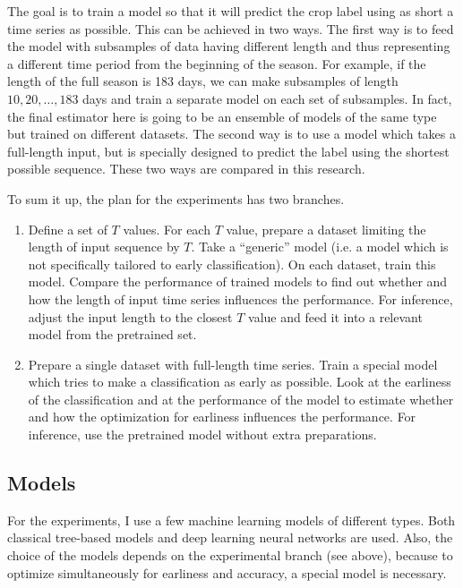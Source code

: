 \documentclass{article}
\begin{document}
The goal is to train a model so that it will predict the crop label using as short a time series as possible. This can be achieved in two ways. The first way is to feed the model with subsamples of data having different length and thus representing a different time period from the beginning of the season. For example, if the length of the full season is 183 days, we can make subsamples of length $10, 20 , \ldots, 183$ days and train a separate model on each set of subsamples. In fact, the final estimator here is going to be an ensemble of models of the same type but trained on different datasets. The second way is to use a model which takes a full-length input, but is specially designed to predict the label using the shortest possible sequence. These two ways are compared in this research.

To sum it up, the plan for the experiments has two branches.

\begin{enumerate}
    \item Define a set of $T$ values. For each $T$ value, prepare a dataset limiting the length of input sequence by $T$. Take a “generic” model (i.e. a model which is not specifically tailored to early classification). On each dataset, train this model. Compare the performance of trained models to find out whether and how the length of input time series influences the performance. For inference, adjust the input length to the closest $T$ value and feed it into a relevant model from the pretrained set.
    \item Prepare a single dataset with full-length time series. Train a special model which tries to make a classification as early as possible. Look at the earliness of the classification and at the performance of the model to estimate whether and how the optimization for earliness influences the performance. For inference, use the pretrained model without extra preparations.
\end{enumerate}

\subsection{Models}

For the experiments, I use a few machine learning models of different types. Both classical tree-based models and deep learning neural networks are used. Also, the choice of the models depends on the experimental branch (see above), because to optimize simultaneously for earliness and accuracy, a special model is necessary.
\end{document}
